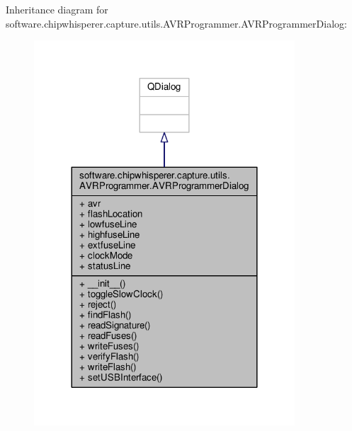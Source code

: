 Inheritance diagram for software.\+chipwhisperer.\+capture.\+utils.\+A\+V\+R\+Programmer.\+A\+V\+R\+Programmer\+Dialog\+:\nopagebreak
\begin{figure}[H]
\begin{center}
\leavevmode
\includegraphics[width=276pt]{da/d69/classsoftware_1_1chipwhisperer_1_1capture_1_1utils_1_1AVRProgrammer_1_1AVRProgrammerDialog__inherit__graph}
\end{center}
\end{figure}


